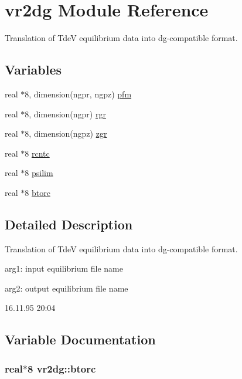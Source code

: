 \hypertarget{namespacevr2dg}{
\section{vr2dg Module Reference}
\label{namespacevr2dg}
}
Translation of TdeV equilibrium data into dg-compatible format.  


\subsection*{Variables}
\begin{CompactItemize}
\item 
real $\ast$8, dimension(ngpr, ngpz) \hyperlink{namespacevr2dg_42625803c3e8d435cb3bcfbcdee23e3c}{pfm}
\item 
real $\ast$8, dimension(ngpr) \hyperlink{namespacevr2dg_3eeb651bf34a7d309b1864cc47e11dcb}{rgr}
\item 
real $\ast$8, dimension(ngpz) \hyperlink{namespacevr2dg_5d150eacbf91120938d72cbc757d5553}{zgr}
\item 
real $\ast$8 \hyperlink{namespacevr2dg_93160973c5eabc15efb36b70f53bcb02}{rcntc}
\item 
real $\ast$8 \hyperlink{namespacevr2dg_392d636527ed6281bd226ab7b1c54ac1}{psilim}
\item 
real $\ast$8 \hyperlink{namespacevr2dg_e099a50d66459d94c494edf28bc68b78}{btorc}
\end{CompactItemize}


\subsection{Detailed Description}
Translation of TdeV equilibrium data into dg-compatible format. 

arg1: input equilibrium file name

arg2: output equilibrium file name

\begin{Desc}
\item[Version:]16.11.95 20:04 \end{Desc}


\subsection{Variable Documentation}
\hypertarget{namespacevr2dg_e099a50d66459d94c494edf28bc68b78}{
\subsubsection[btorc]{\setlength{\rightskip}{0pt plus 5cm}real$\ast$8 {\bf vr2dg::btorc}}}
\label{namespacevr2dg_e099a50d66459d94c494edf28bc68b78}




